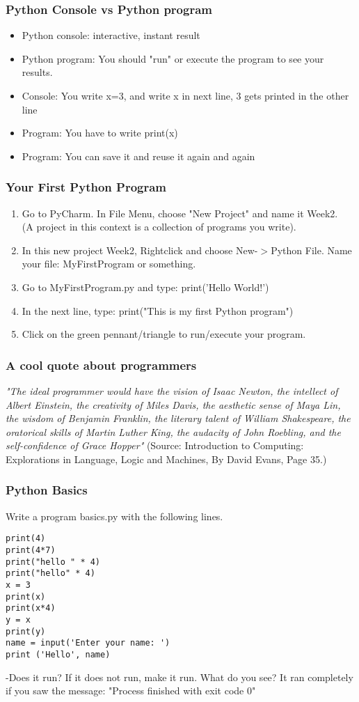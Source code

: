 \documentclass{beamer}
\begin{document}
\begin{frame}
\frametitle{Python Console vs Python program}
\begin{itemize}
\item Python console: interactive, instant result
\item Python program: You should "run" or execute the program to see your results.
\item Console: You write x=3, and write x in next line, 3 gets printed in the other line
\item Program: You have to write print(x)
\item Program: You can save it and reuse it again and again
\end{itemize}
\end{frame}

\begin{frame}
\frametitle{Your First Python Program}
\begin{enumerate}
\item Go to PyCharm. In File Menu, choose "New Project" and name it Week2. 
\\ (A project in this context is a collection of programs you write).
\item In this new project Week2, Rightclick and choose New-$>$Python File. Name your file: MyFirstProgram or something.
\item Go to MyFirstProgram.py and type: print('Hello World!')
\item In the next line, type: print("This is my first Python program")
\item Click on the green pennant/triangle to run/execute your program.
\end{enumerate}
\end{frame}

\begin{frame}
\frametitle{A cool quote about programmers}
\textit{"The ideal programmer would have the vision of Isaac Newton, the intellect of Albert Einstein, the creativity of Miles Davis, the aesthetic sense of Maya Lin, the wisdom of Benjamin Franklin, the literary talent of William Shakespeare,
the oratorical skills of Martin Luther King, the audacity of John Roebling, and the self-confidence of Grace Hopper"}
\medskip (Source: Introduction to Computing: Explorations in Language, Logic and Machines, By David Evans, Page 35.)
\end{frame}

\begin{frame}[fragile]
\frametitle{Python Basics}
Write a program basics.py with the following lines.
\begin{verbatim}
print(4)
print(4*7)
print("hello " * 4)
print("hello" * 4)
x = 3
print(x)
print(x*4)
y = x
print(y)
name = input('Enter your name: ')
print ('Hello', name)
\end{verbatim}
-Does it run? If it does not run, make it run. What do you see?  It ran completely if you saw the message: "Process finished with exit code 0"
\end{frame}
\end{document}
